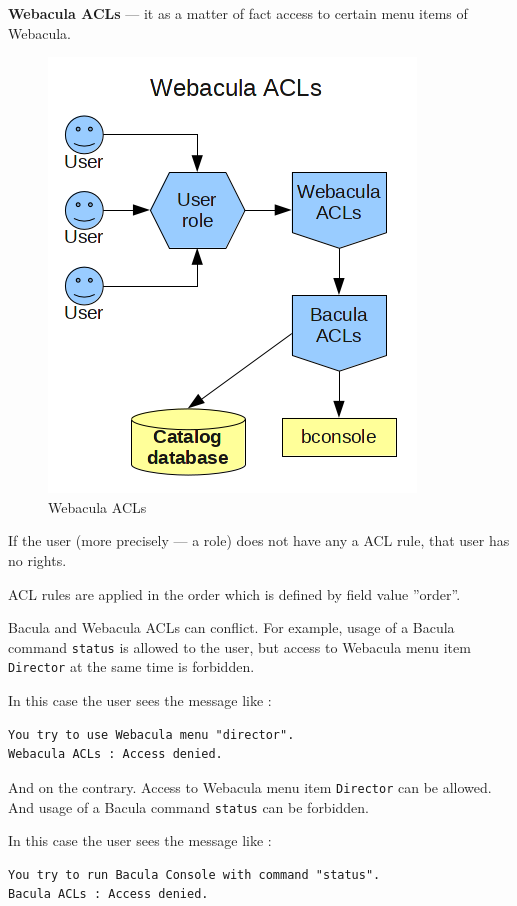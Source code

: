 \documentclass[10pt]{article}
\begin{document}
\textbf{Webacula ACLs} --- it as a matter of fact access to certain menu items of Webacula.

\begin{figure}[htp]
  \centering
  \includegraphics[totalheight=0.45\textheight,keepaspectratio=true]{./pics/ACLs.png}
  \caption[Webacula ACLs]{Webacula ACLs}
  \label{Webacula ACLs}
\end{figure}

If the user (more precisely --- a role) does not have any a ACL rule, that user has no rights.

ACL rules are applied in the order which is defined by field value ''order''.

Bacula and Webacula ACLs can conflict.
For example, usage of a Bacula command \texttt{status} is allowed to the user,
but access to Webacula menu item \texttt{Director} at the same time is forbidden.

In this case the user sees the message like :
\begin{verbatim}
You try to use Webacula menu "director".
Webacula ACLs : Access denied.
\end{verbatim}

And on the contrary.
Access to Webacula menu item \texttt{Director} can be allowed. And usage of a Bacula command \texttt{status} can be forbidden.

In this case the user sees the message like :
\begin{verbatim}
You try to run Bacula Console with command "status".
Bacula ACLs : Access denied.
\end{verbatim}
\end{document}
